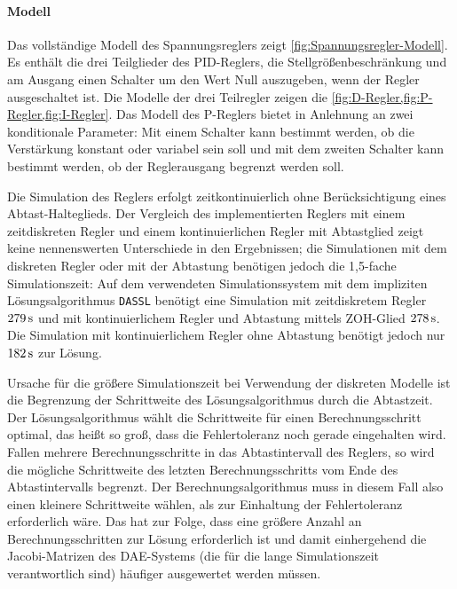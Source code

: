 \paragraph{Modell}\label{modell-Regler}
Das vollständige Modell des Spannungsreglers zeigt \cref{fig:Spannungsregler-Modell}. Es enthält die drei Teilglieder des PID-Reglers, die Stellgrößenbeschränkung und am Ausgang einen Schalter um den Wert Null auszugeben, wenn der Regler ausgeschaltet ist. Die Modelle der drei Teilregler zeigen die \cref{fig:D-Regler,fig:P-Regler,fig:I-Regler}. Das Modell des P-Reglers bietet in Anlehnung an \cite{pillerpowersystemsDigitalerSpannungsreglerSoftwaredokumentation1997} zwei konditionale Parameter: Mit einem Schalter kann bestimmt werden, ob die Verstärkung konstant oder variabel sein soll und mit dem zweiten Schalter kann bestimmt werden, ob der Reglerausgang begrenzt werden soll. 

Die Simulation des Reglers erfolgt zeitkontinuierlich ohne Berücksichtigung eines Abtast-Halteglieds. Der Vergleich des implementierten Reglers mit einem zeitdiskreten Regler und einem kontinuierlichen Regler mit Abtastglied zeigt keine nennenswerten Unterschiede in den Ergebnissen; die Simulationen mit dem diskreten Regler oder mit der Abtastung benötigen jedoch die 1,5-fache Simulationszeit: Auf dem verwendeten Simulationssystem mit dem impliziten Lösungsalgorithmus \texttt{DASSL} benötigt eine Simulation mit zeitdiskretem Regler $\unit[279]{s}$ und mit kontinuierlichem Regler und Abtastung mittels ZOH-Glied $\unit[278]{s}$.  Die Simulation mit kontinuierlichem Regler ohne Abtastung benötigt jedoch nur $\unit[182]{s}$ zur Lösung. 

Ursache für die größere Simulationszeit bei Verwendung der diskreten Modelle ist die Begrenzung der Schrittweite des Lösungsalgorithmus durch die Abtastzeit. Der Lösungsalgorithmus wählt die Schrittweite für einen Berechnungsschritt optimal, das heißt so groß, dass die Fehlertoleranz noch gerade eingehalten wird. Fallen mehrere Berechnungsschritte in das Abtastintervall des Reglers, so wird die mögliche Schrittweite des letzten Berechnungsschritts vom Ende des Abtastintervalls begrenzt. Der Berechnungsalgorithmus muss in diesem Fall also einen kleinere Schrittweite wählen, als zur Einhaltung der Fehlertoleranz erforderlich wäre. Das hat zur Folge, dass eine größere Anzahl an Berechnungsschritten zur Lösung erforderlich ist und damit einhergehend die Jacobi-Matrizen des DAE-Systems (die für die lange Simulationszeit verantwortlich sind) häufiger ausgewertet werden müssen. 

